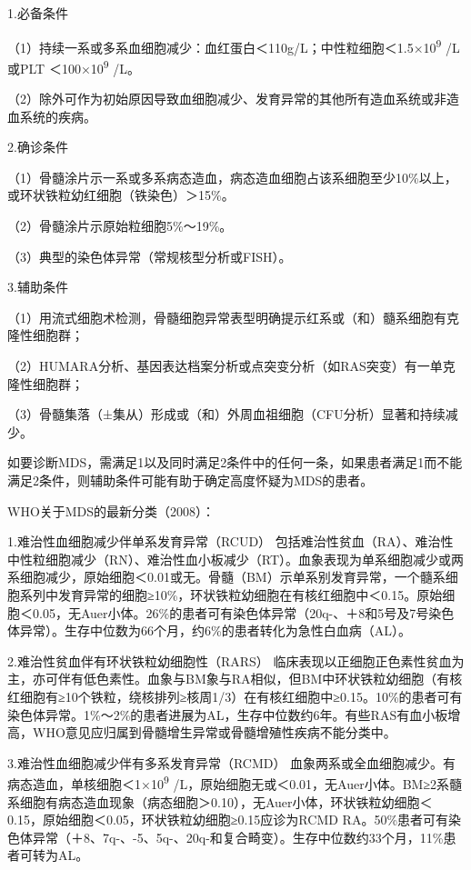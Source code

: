 1.必备条件

（1）持续一系或多系血细胞减少：血红蛋白＜110g/L；中性粒细胞＜1.5×10\textsuperscript{9}
/L或PLT ＜100×10\textsuperscript{9} /L。

（2）除外可作为初始原因导致血细胞减少、发育异常的其他所有造血系统或非造血系统的疾病。

2.确诊条件

（1）骨髓涂片示一系或多系病态造血，病态造血细胞占该系细胞至少10\%以上，或环状铁粒幼红细胞（铁染色）＞15\%。

（2）骨髓涂片示原始粒细胞5\%～19\%。

（3）典型的染色体异常（常规核型分析或FISH）。

3.辅助条件

（1）用流式细胞术检测，骨髓细胞异常表型明确提示红系或（和）髓系细胞有克隆性细胞群；

（2）HUMARA分析、基因表达档案分析或点突变分析（如RAS突变）有一单克隆性细胞群；

（3）骨髓集落（±集从）形成或（和）外周血祖细胞（CFU分析）显著和持续减少。

如要诊断MDS，需满足1以及同时满足2条件中的任何一条，如果患者满足1而不能满足2条件，则辅助条件可能有助于确定高度怀疑为MDS的患者。

WHO关于MDS的最新分类（2008）：

1.难治性血细胞减少伴单系发育异常（RCUD）
包括难治性贫血（RA）、难治性中性粒细胞减少（RN）、难治性血小板减少（RT）。血象表现为单系细胞减少或两系细胞减少，原始细胞＜0.01或无。骨髓（BM）示单系别发育异常，一个髓系细胞系列中发育异常的细胞≥10\%，环状铁粒幼细胞在有核红细胞中＜0.15。原始细胞＜0.05，无Auer小体。26\%的患者可有染色体异常（20q-、＋8和5号及7号染色体异常）。生存中位数为66个月，约6\%的患者转化为急性白血病（AL）。

2.难治性贫血伴有环状铁粒幼细胞性（RARS）
临床表现以正细胞正色素性贫血为主，亦可伴有低色素性。血象与BM象与RA相似，但BM中环状铁粒幼细胞（有核红细胞有≥10个铁粒，绕核排列≥核周1/3）在有核红细胞中≥0.15。10\%的患者可有染色体异常。1\%～2\%的患者进展为AL，生存中位数约6年。有些RAS有血小板增高，WHO意见应归属到骨髓增生异常或骨髓增殖性疾病不能分类中。

3.难治性血细胞减少伴有多系发育异常（RCMD）
血象两系或全血细胞减少。有病态造血，单核细胞＜1×10\textsuperscript{9}
/L，原始细胞无或＜0.01，无Auer小体。BM≥2系髓系细胞有病态造血现象（病态细胞＞0.10），无Auer小体，环状铁粒幼细胞＜0.15，原始细胞＜0.05，环状铁粒幼细胞≥0.15应诊为RCMD
RA。50\%患者可有染色体异常（＋8、7q-、-5、5q-、20q-和复合畸变）。生存中位数约33个月，11\%患者可转为AL。


